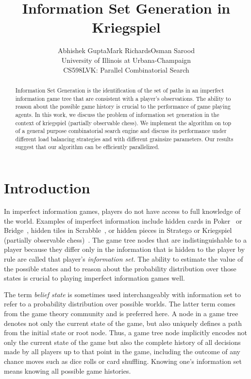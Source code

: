 \documentclass[conference]{IEEEtran}
\begin{document}
\title{Information Set Generation in Kriegspiel}
\author{Abhishek Gupta\qquad Mark Richards\qquad Osman Sarood\\University of Illinois at Urbana-Champaign\\CS598LVK:
Parallel Combinatorial Search} \maketitle

\begin{abstract}
Information Set Generation is the identification of the set of paths in an imperfect information game tree that are
consistent with a player's observations.  The ability to reason about the possible game history is crucial to the
performance of game playing agents.  In this work, we discuss the problem of information set generation in the context
of kriegspiel (partially observable chess).  We implement the algorithm on top of a general purpose combinatorial search
engine and discuss its performance under different load balancing strategies and with different grainsize parameters.
Our results suggest that our algorithm can be efficiently parallelized.  \end{abstract}

\section{Introduction}
In imperfect information games, players do not have access to full knowledge of the world. Examples of imperfect
information include hidden cards in Poker~\cite{billings02challenge} or Bridge~\cite{ginsberg96partition}, hidden tiles
in Scrabble~\cite{richards07opponent}, or hidden pieces in Stratego or Kriegspiel (partially observable
chess)~\cite{li94chess}. The game tree nodes that are indistinguishable to a player because they differ only in the
information that is hidden to the player by rule are called that player's {\em information set.}  The ability to
estimate the value of the possible states and to reason about the probability distribution over those states is crucial
to playing imperfect information games well. 

The term {\em belief state} is sometimes used interchangeably with information set to refer to a probability
distribution over possible worlds.  The latter term comes from the game theory community and is preferred here.  A node
in a game tree denotes not only the current state of the game, but also uniquely defines a path from the initial state
or root node.  Thus, a game tree node implicitly encodes not only the current state of the game but also the complete
history of all decisions made by all players up to that point in the game, including the outcome of any chance moves
such as dice rolls or card shuffling.  Knowing one's information set means knowing all possible game histories.
\end{document}
